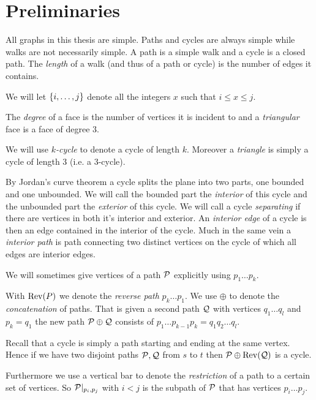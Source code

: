 
\section{Preliminaries}
All graphs in this thesis are simple. Paths and cycles are always simple while walks are not necessarily simple. A path is a simple walk and a cycle is a closed path.
The \emph{length} of a walk (and thus of a path or cycle) is the number of edges it contains.

We will let $\braces {i, \ldots, j}$ denote all the integers $x$ such that $i \leq x \leq j$.

The \emph{degree} of a face is the number of vertices it is incident to and a \emph{triangular} face is a face of degree $3$.

 We will use \emph{$k$-cycle} to denote a cycle of length $k$. Moreover a \emph{triangle} is simply a cycle of length $3$ (i.e. a $3$-cycle).

By Jordan's curve theorem a cycle splits the plane into two parts, one bounded and one unbounded. We will call the bounded part the \emph{interior} of this cycle and the unbounded part the \emph{exterior} of this cycle.
We will call a cycle \emph{separating} if there are vertices in both it's interior and exterior.
An \emph{interior edge} of a cycle is then an edge contained in the interior of the cycle. Much in the same vein a \emph{interior path} is path connecting two distinct vertices on the cycle of which all edges are interior edges.

  We will sometimes give vertices of a path $\P$ explicitly using $p_1 \ldots p_k$.

  With $\rev(P)$ we denote the \emph{reverse path} $p_k \ldots p_1$. We use $\oplus$ to denote the \emph{concatenation} of paths. That is given a second path $\Q$ with vertices $q_1 \ldots q_l$ and $p_k = q_1$ the new path $\P \oplus \Q$ consists of $p_1 \ldots p_{k-1} p_k=q_1 q_2 \ldots q_l$.

  Recall that a cycle is simply a path starting and ending at the same vertex. Hence if we have two disjoint paths $\P, \Q$ from $s$ to $t$ then $\P \oplus \rev(\Q)$ is a cycle.

  Furthermore we use a vertical bar to denote the \emph{restriction} of a path to a certain set of vertices. So $\P|_{p_i, p_j}$ with $i<j$ is the subpath of $\P$ that has vertices $p_i \ldots p_j$.

